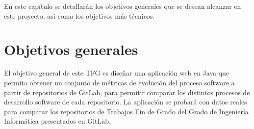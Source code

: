 
En este capítulo se detallarán los objetivos generales que se desean alcanzar en este proyecto, así como los objetivos más técnicos.

\section{Objetivos generales}
El objetivo general de este TFG es diseñar una aplicación web en Java que permita obtener un conjunto de métricas de evolución del proceso software \cite{ratzinger_space:_2007} a partir de repositorios de GitLab, para permitir comparar los distintos procesos de desarrollo software de cada repositorio.
La aplicación se probará con datos reales para comparar los repositorios de Trabajos Fin de Grado del Grado de Ingeniería Informática presentados en GitLab.
   
